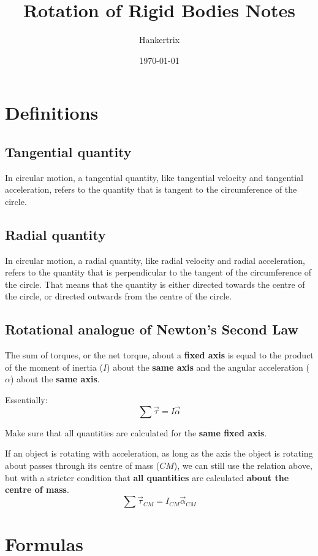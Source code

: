 \documentclass[11pt]{article}
\author{Hankertrix}
\date{\today}
\title{Rotation of Rigid Bodies Notes}
\begin{document}
\maketitle
\setcounter{tocdepth}{2}
\tableofcontents \clearpage\section{Definitions}
\label{sec:orgf464cb8}

\subsection{Tangential quantity}
\label{sec:org9ebfcb3}
In circular motion, a tangential quantity, like tangential velocity and tangential acceleration, refers to the quantity that is tangent to the circumference of the circle.
\subsection{Radial quantity}
\label{sec:org6d95fbe}
In circular motion, a radial quantity, like radial velocity and radial acceleration, refers to the quantity that is perpendicular to the tangent of the circumference of the circle. That means that the quantity is either directed towards the centre of the circle, or directed outwards from the centre of the circle.
\subsection{Rotational analogue of Newton's Second Law}
\label{sec:org153f9bc}
The sum of torques, or the net torque, about a \textbf{fixed axis} is equal to the product of the moment of inertia (\(I\)) about the \textbf{same axis} and the angular acceleration (\(\alpha\)) about the \textbf{same axis}.


Essentially:
\[\sum \vec{\tau} = I \vec{\alpha}\]

Make sure that all quantities are calculated for the \textbf{same fixed axis}.


If an object is rotating with acceleration, as long as the axis the object is rotating about passes through its centre of mass (\(CM\)), we can still use the relation above, but with a stricter condition that \textbf{all quantities} are calculated \textbf{about the centre of mass}.
\[\sum \vec{\tau}_{CM} = I_{CM} \vec{\alpha}_{CM}\]

\newpage
\section{Formulas}
\label{sec:org7c498fb}
\end{document}
